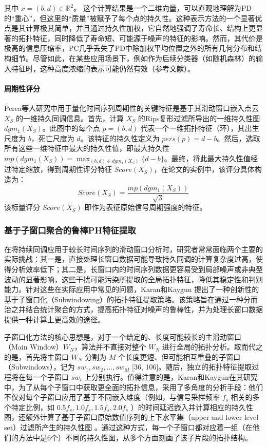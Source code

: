 其中 $x = (b, d) \in \mathbb{R}^2$。
这个计算结果是一个二维向量，可以直观地理解为PD的“重心”，但这里的“质量”被赋予了每个点的持久性。这种表示方法的一个显著优点是其计算极其简单，并且通过持久性加权，它自然地强调了寿命长、结构上更显著的拓扑特征，同时降低了寿命短、可能源于噪声的特征的影响。然而，其代价是极高的信息压缩率，PC几乎丢失了PD中除加权平均位置之外的所有几何分布和结构细节。尽管如此，在某些应用场景下，例如作为后续分类器（如随机森林）的输入特征时，这种高度浓缩的表示可能仍然有效（参考文献\cite{JSJC202406009}）。

\paragraph{周期性评分}
Perea等人\cite{perea2015sliding}研究中用于量化时间序列周期性的关键特征是基于其滑动窗口嵌入点云 $X_S$ 的一维持久同调信息。首先，计算 $X_S$ 的Rips复形过滤所导出的一维持久性图 $dgm_1(X_S)$。此图中的每个点 $p=(b,d)$ 代表一个一维拓扑特征（环），其出生尺度为 $b$，死亡尺度为 $d$。该特征的持久性定义为 $pers(p) = d-b$。然后，选取所有这些一维特征中最大的持久性值，即最大持久性 $mp(dgm_1(X_S)) = \max_{(b,d) \in dgm_1(X_S)} \{d-b\}$。最终，将此最大持久性值经过特定缩放，得到周期性评分特征 $Score(X_S)$，在论文的实例中，该评分具体构造为：
\begin{equation}
    Score(X_S) = \frac{mp(dgm_1(X_S))}{\sqrt{3}}
\end{equation}
该标量评分 $Score(X_S)$ 即作为表征原始信号周期强度的特征。
\subsubsection{基于子窗口聚合的鲁棒PH特征提取}
在将持续同调应用于较长时间序列的滑动窗口分析时，研究者常常面临两个主要的实际挑战：其一是，直接处理长窗口数据可能导致持久同调的计算复杂度过高，使得分析效率低下；其二是，长窗口内的时间序列数据更容易受到局部噪声或非典型波动的显著影响，这些干扰可能污染所提取的全局拓扑特征，降低其稳定性和判别能力。针对这些在实际应用中常见的问题，Karan和Kaygun \cite{3} 提出了一种创新性的基于子窗口化（Subwindowing）的拓扑特征提取策略。该策略旨在通过一种分而治之并结合统计聚合的方式，提高拓扑特征对噪声的鲁棒性，并为处理长窗口数据提供一种计算上更高效的途径。

子窗口化方法的核心思想是，对于一个给定的、长度可能较长的主滑动窗口（Main Window）$W_N$，算法并不直接对整个 $W_N$ 进行全局的拓扑分析。取而代之的是，首先将主窗口 $W_N$ 分割为 $M$ 个长度更短、但可能相互重叠的子窗口（Subwindows），记为 $sw_1, sw_2, \dots, sw_M$ [36, 106]。随后，独立的拓扑特征提取过程将在每一个子窗口 $sw_i$ 上分别执行。值得注意的是，Karan和Kaygun在其研究中，为了从每个子窗口中获取更全面的拓扑信息，采用了多角度的分析手段：他们不仅对每个子窗口应用了基于不同嵌入维度（例如，与信号采样频率 $f_s$ 相关的多个特定比例，如 $0.5f_s, 1.0f_s, 1.5f_s, 2.0f_s$ ）的时间延迟嵌入并计算相应的持久性图，还额外计算了基于子窗口原始数值序列的上下水平集（upper and lower level set）过滤所产生的持久性图 。通过这种方式，每一个子窗口都对应着一组（在他们的方法中是6个）不同的持久性图，从多个方面刻画了该子片段的拓扑结构。

